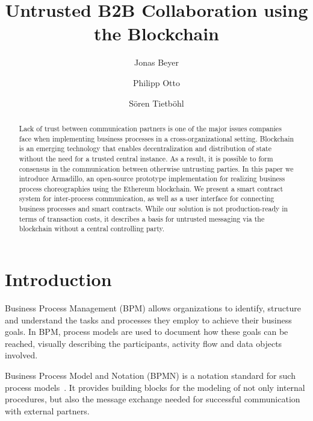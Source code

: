 \documentclass[runningheads]{llncs}
\begin{document}
%
\title{Untrusted B2B Collaboration using the Blockchain}
%
%
\author{Jonas Beyer \and Philipp Otto \and S\"oren Tietb\"ohl}
%
%
%
\maketitle %
%
\begin{abstract}
	Lack of trust between communication partners is one of the major issues companies face when implementing business processes in a cross-organizational setting.
	Blockchain is an emerging technology that enables decentralization and distribution of state without the need for a trusted central instance.
	As a result, it is possible to form consensus in the communication between otherwise untrusting parties.
	In this paper we introduce Armadillo, an open-source prototype implementation for realizing business process choreographies using the Ethereum blockchain.
	We present a smart contract system for inter-process communication, as well as a user interface for connecting business processes and smart contracts.
	While our solution is not production-ready in terms of transaction costs, it describes a basis for untrusted messaging via the blockchain without a central controlling party.

\end{abstract}
%
\section{Introduction}
Business Process Management (BPM) allows organizations to identify, structure and understand the tasks and processes they employ to achieve their business goals.
In BPM, process models are used to document how these goals can be reached, visually describing the participants, activity flow and data objects involved.

Business Process Model and Notation (BPMN) is a notation standard for such process models~\cite{omg2014bpmn}.
It provides building blocks for the modeling of not only internal procedures, but also the message exchange needed for successful communication with external partners.
\end{document}
